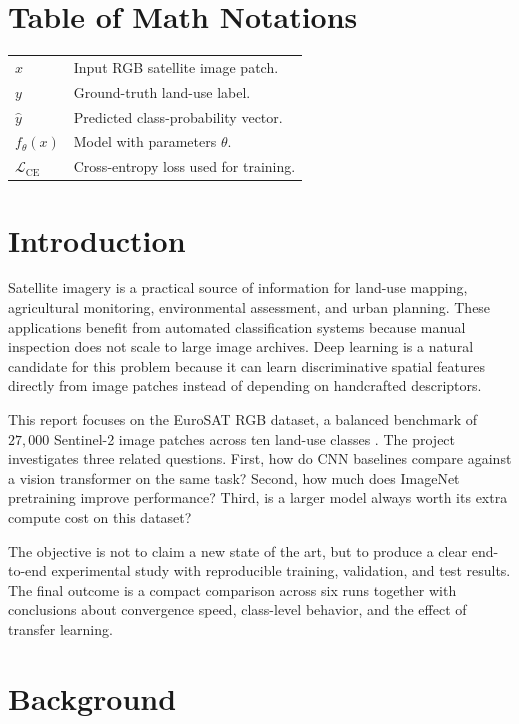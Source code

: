 \documentclass[11pt]{report}
\begin{document}
\chapter*{Table of Math Notations}
\begin{tabularx}{\textwidth}{>{\bfseries}l X}
    \(x\) & Input RGB satellite image patch. \\
    \(y\) & Ground-truth land-use label. \\
    \(\hat{y}\) & Predicted class-probability vector. \\
    \(f_{\theta}(x)\) & Model with parameters \(\theta\). \\
    \(\mathcal{L}_{\mathrm{CE}}\) & Cross-entropy loss used for training. \\
\end{tabularx}

\tableofcontents
\clearpage
{}

\chapter{Introduction}
Satellite imagery is a practical source of information for land-use mapping, agricultural monitoring, environmental assessment, and urban planning. These applications benefit from automated classification systems because manual inspection does not scale to large image archives. Deep learning is a natural candidate for this problem because it can learn discriminative spatial features directly from image patches instead of depending on handcrafted descriptors.

This report focuses on the EuroSAT RGB dataset, a balanced benchmark of \(27{,}000\) Sentinel-2 image patches across ten land-use classes \cite{helber2019}. The project investigates three related questions. First, how do CNN baselines compare against a vision transformer on the same task? Second, how much does ImageNet pretraining improve performance? Third, is a larger model always worth its extra compute cost on this dataset?

The objective is not to claim a new state of the art, but to produce a clear end-to-end experimental study with reproducible training, validation, and test results. The final outcome is a compact comparison across six runs together with conclusions about convergence speed, class-level behavior, and the effect of transfer learning.

\chapter{Background}
\end{document}
